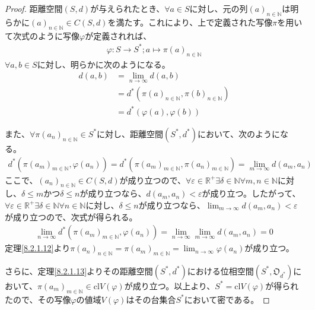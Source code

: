 \documentclass[dvipdfmx]{jsarticle}
\begin{document}
\begin{proof}
距離空間$(S,d)$が与えられたとき、$\forall a \in S$に対し、元の列$(a)_{n \in \mathbb{N}}$は明らかに$(a)_{n \in \mathbb{N}} \in C(S,d)$を満たす。これにより、上で定義された写像$\pi$を用いて次式のように写像$\varphi$が定義されれば、
\begin{align*}
\varphi:S \rightarrow S^{*};a \mapsto \pi(a)_{n \in \mathbb{N}}
\end{align*}
$\forall a,b \in S$に対し、明らかに次のようになる。
\begin{align*}
d(a,b) &= \lim_{n \rightarrow \infty}{d(a,b)}\\
&= d^{*}\left( \pi(a)_{n \in \mathbb{N}},\pi(b)_{n \in \mathbb{N}} \right)\\
&= d^{*}\left( \varphi(a),\varphi(b) \right)
\end{align*}\par
また、$\forall\pi\left( a_{n} \right)_{n \in \mathbb{N}} \in S^{*}$に対し、距離空間$\left( S^{*},d^{*} \right)$において、次のようになる。
\begin{align*}
d^{*}\left( \pi\left( a_{m} \right)_{m \in \mathbb{N}},\varphi\left( a_{n} \right) \right) = d^{*}\left( \pi\left( a_{m} \right)_{m \in \mathbb{N}},\pi\left( a_{n} \right)_{m \in \mathbb{N}} \right) = \lim_{m \rightarrow \infty}{d\left( a_{m},a_{n} \right)}
\end{align*}
ここで、$\left( a_{n} \right)_{n \in \mathbb{N}} \in C(S,d)$が成り立つので、$\forall\varepsilon \in \mathbb{R}^{+}\exists\delta \in \mathbb{N}\forall m,n \in \mathbb{N}$に対し、$\delta \leq m$かつ$\delta \leq n$が成り立つなら、$d\left( a_{m},a_{n} \right) < \varepsilon$が成り立つ。したがって、$\forall\varepsilon \in \mathbb{R}^{+}\exists\delta \in \mathbb{N}\forall n \in \mathbb{N}$に対し、$\delta \leq n$が成り立つなら、$\lim_{m \rightarrow \infty}{d\left( a_{m},a_{n} \right)} < \varepsilon$が成り立つので、次式が得られる。
\begin{align*}
\lim_{n \rightarrow \infty}{d^{*}\left( \pi\left( a_{m} \right)_{m \in \mathbb{N}},\varphi\left( a_{n} \right) \right)} = \lim_{n \rightarrow \infty}{\lim_{m \rightarrow \infty}{d\left( a_{m},a_{n} \right)}} = 0
\end{align*}
定理\ref{8.2.1.12}より$\pi\left( a_{n} \right)_{n \in \mathbb{N}} = \pi\left( a_{m} \right)_{m \in \mathbb{N}} = \lim_{n \rightarrow \infty}{\varphi\left( a_{n} \right)}$が成り立つ。\par
さらに、定理\ref{8.2.1.13}よりその距離空間$\left( S^{*},d^{*} \right)$における位相空間$\left( S^{*},\mathfrak{O}_{d^{*}} \right)$において、$\pi\left( a_{m} \right)_{m \in \mathbb{N}} \in {\mathrm{cl}}{V(\varphi)}$が成り立つ。以上より、$S^{*} = {\mathrm{cl}}{V(\varphi)}$が得られたので、その写像$\varphi$の値域$V(\varphi)$はその台集合$S^{*}$において密である。\par

\end{proof}
\end{document}
